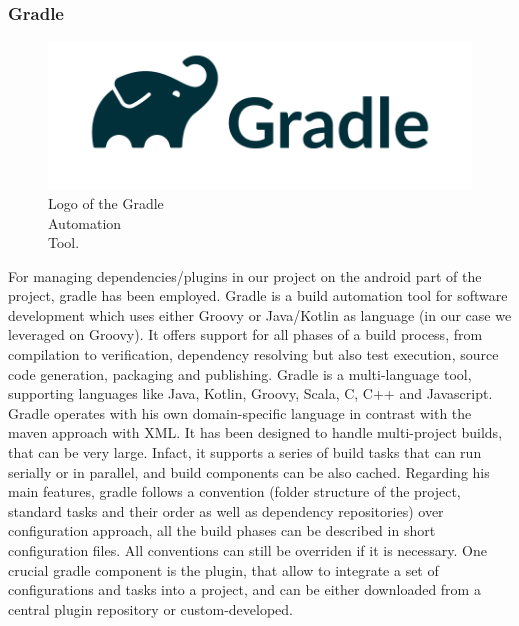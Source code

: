 \newpage
\subsubsection{Gradle}
\label{subsubsec:gradle}

\begin{figure} %
    \captionsetup{font=footnotesize}
    \centering
    \includegraphics[width=\linewidth]{images/gradle.png}
    \caption{Logo of the Gradle\\Automation\\Tool.}
\end{figure}

For managing dependencies/plugins in our project on the android part of the project, gradle has been employed. Gradle is a build automation tool for software development which uses either Groovy or Java/Kotlin as language (in our case we leveraged on Groovy). It offers support for all phases of a build process, from compilation to verification, dependency resolving but also test execution, source code generation, packaging and publishing. Gradle is a multi-language tool, supporting languages like Java, Kotlin, Groovy, Scala, C, C++ and Javascript. Gradle operates with his own domain-specific language in contrast with the maven approach with XML. It has been designed to handle multi-project builds, that can be very large. Infact, it supports a series of build tasks that can run serially or in parallel, and build components can be also cached. Regarding his main features, gradle follows a convention (folder structure of the project, standard tasks and their order as well as dependency repositories) over configuration approach, all the build phases can be described in short configuration files. All conventions can still be overriden if it is necessary. One crucial gradle component is the plugin, that allow to integrate a set of configurations and tasks into a project, and can be either downloaded from a central plugin repository or custom-developed\cite{Gradle}.

